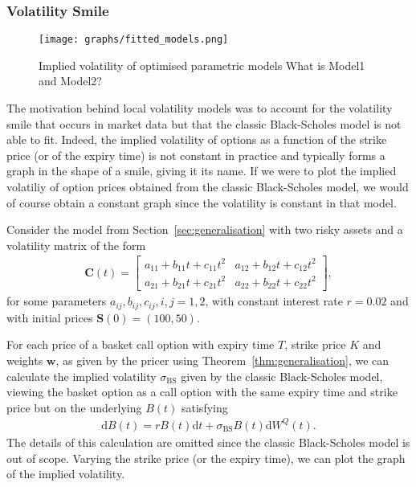 \documentclass[english]{article}
\newcommand{\comment}[1]{\color{blue}#1\color{black}}
\numberwithin{equation}{section}
\numberwithin{figure}{section}
\theoremstyle{bolddescit}
\theoremstyle{definition}
\theoremstyle{definition}
\theoremstyle{plain}
\theoremstyle{plain}
\theoremstyle{bolddesc}
\theoremstyle{plain}
\theoremstyle{remark}
\begin{document}
\subsubsection{Volatility Smile}

\begin{figure}
  \caption{Implied volatility of optimised parametric models
\comment{What is Model1 and Model2? }
  }
  \texttt{[image: graphs/fitted\_models.png]}
  \label{fig:fitted-models}
\end{figure}

The motivation behind local volatility models was to account for the volatility smile that occurs in market data but that the classic Black-Scholes model is not able to fit. Indeed, the implied volatility of options as a function of the strike price (or of the expiry time) is not constant in practice and typically forms a graph in the shape of a smile, giving it its name. If we were to plot the implied volatiliy of option prices obtained from the classic Black-Scholes model, we would of course obtain a constant graph since the volatility is constant in that model.

Consider the model from Section~\ref{sec:generalisation} with two risky assets and a volatility matrix of the form
\begin{align*}
  \mathbf{C}(t) = \begin{bmatrix}
    a_{11} + b_{11} t + c_{11} t^2 & a_{12} + b_{12} t + c_{12} t^2\\
    a_{21} + b_{21} t + c_{21} t^2 & a_{22} + b_{22} t + c_{22} t^2
  \end{bmatrix},
\end{align*}
for some parameters $a_{ij}, b_{ij}, c_{ij}, i,j=1,2$, with constant interest rate $r = 0.02$ and with initial prices $\mathbf{S}(0) = (100, 50)$.

For each price of a basket call option with expiry time $T$, strike price $K$ and weights $\mathbf{w}$, as given by the pricer using Theorem~\ref{thm:generalisation}, we can calculate the implied volatility $\sigma_\text{BS}$ given by the classic Black-Scholes model, viewing the basket option as a call option with the same expiry time and strike price but on the underlying $B(t)$ satisfying
\begin{align*}
  \mathrm{d}B(t) = r B(t) \mathrm{d}t + \sigma_\text{BS} B(t) \mathrm{d}W^Q(t).
\end{align*}
The details of this calculation are omitted since the classic Black-Scholes model is out of scope. Varying the strike price (or the expiry time), we can plot the graph of the implied volatility.
\end{document}
